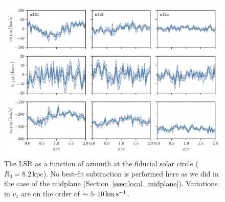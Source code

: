 \documentclass[twocolumn]{aastex62}
\newcommand{\kpc}{\text{kpc}}
\newcommand{\kms}{\text{km}\,\text{s}^{-1}}
\begin{document}
\begin{figure}[htb!]
\begin{center}
\includegraphics[width=\textwidth]{fig/lsr.pdf}
\end{center}
\caption{The LSR as a function of azimuth at the fiducial solar circle ($R_0 =
8.2\,\kpc$). No best-fit subtraction is performed here as we did in the case
of the midplane (Section~\ref{ssec:local_midplane}). Variations in $v_z$ are
on the order of $\sim5\textup{--}10\,\kms$.}
\label{fig:lsr_variations}
\end{figure}


\end{document}
